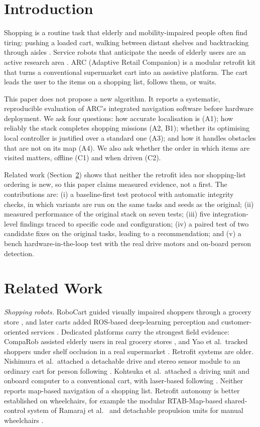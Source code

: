 \documentclass[conference]{IEEEtran}
\begin{document}
\section{Introduction}
Shopping is a routine task that elderly and mobility-impaired people often find tiring: pushing a loaded cart, walking between distant shelves and backtracking through aisles \cite{estember2017}. Service robots that anticipate the needs of elderly users are an active research area \cite{yueh2026}. ARC (Adaptive Retail Companion) is a modular retrofit kit that turns a conventional supermarket cart into an assistive platform. The cart leads the user to the items on a shopping list, follows them, or waits.

This paper does not propose a new algorithm. It reports a systematic, reproducible evaluation of ARC's integrated navigation software before hardware deployment. We ask four questions: how accurate localisation is (A1); how reliably the stack completes shopping missions (A2, B1); whether its optimising local controller is justified over a standard one (A3); and how it handles obstacles that are not on its map (A4). We also ask whether the order in which items are visited matters, offline (C1) and when driven (C2).

Related work (Section~\ref{sec:rw}) shows that neither the retrofit idea nor shopping-list ordering is new, so this paper claims measured evidence, not a first. The contributions are: (i) a baseline-first test protocol with automatic integrity checks, in which variants are run on the same tasks and seeds as the original; (ii) measured performance of the original stack on seven tests; (iii) five integration-level findings traced to specific code and configuration; (iv) a paired test of two candidate fixes on the original tasks, leading to a recommendation; and (v) a bench hardware-in-the-loop test with the real drive motors and on-board person detection.

\section{Related Work}
\label{sec:rw}
\textit{Shopping robots.} RoboCart guided visually impaired shoppers through a grocery store \cite{kulyukin2005}, and later carts added ROS-based deep-learning perception \cite{su2016} and customer-oriented services \cite{chiang2016}. Dedicated platforms carry the strongest field evidence: CompaRob assisted elderly users in real grocery stores \cite{sales2016}, and Yao et al.\ tracked shoppers under shelf occlusion in a real supermarket \cite{yao2026}. Retrofit systems are older. Nishimura et al.\ attached a detachable drive and stereo sensor module to an ordinary cart for person following \cite{nishimura2007}. Kohtsuka et al.\ attached a driving unit and onboard computer to a conventional cart, with laser-based following \cite{kohtsuka2011}. Neither reports map-based navigation of a shopping list. Retrofit autonomy is better established on wheelchairs, for example the modular RTAB-Map-based shared-control system of Ramaraj et al.\ \cite{ramaraj2024} and detachable propulsion units for manual wheelchairs \cite{kang2026}.
\end{document}
